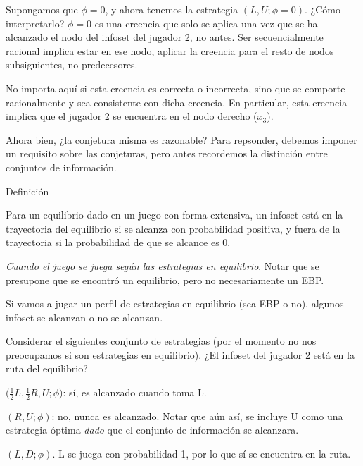 \documentclass[12pt]{article}
\begin{document}
Supongamos que $ \phi = 0 $, y ahora tenemos la estrategia $ (L, U; \phi = 0) $. ¿Cómo interpretarlo? $ \phi=0 $ es una creencia que solo se aplica una vez que se ha alcanzado el nodo del infoset del jugador 2, no antes. Ser secuencialmente racional implica estar en ese nodo, aplicar la creencia para el resto de nodos subsiguientes, no predecesores.

No importa aquí si esta creencia es correcta o incorrecta, sino que se comporte racionalmente y sea consistente con dicha creencia. En particular, esta creencia implica que el jugador 2 se encuentra en el nodo derecho ($ x_3 $).

Ahora bien, ¿la conjetura misma es razonable? Para repsonder, debemos imponer un requisito sobre las conjeturas, pero antes recordemos la distinción entre conjuntos de información.

\begin{mybox}{Definición}
	\begin{defi}
		Para un equilibrio dado en un juego con forma extensiva, un infoset está en la trayectoria del equilibrio si se alcanza con probabilidad positiva, y fuera de la trayectoria si la probabilidad de que se alcance es 0.

		\textit{Cuando el juego se juega según las estrategias en equilibrio}. Notar que se presupone que se encontró un equilibrio, pero no necesariamente un EBP.
	\end{defi}

\end{mybox}

Si vamos a jugar un perfil de estrategias en equilibrio (sea EBP o no), algunos infoset se alcanzan o no se alcanzan.

Considerar el siguientes conjunto de estrategias (por el momento no nos preocupamos si son estrategias en equilibrio). ¿El infoset del jugador 2 está en la ruta del equilibrio?

\begin{myenum}
	\item $\biggl( \frac{1}{2}L, \frac{1}{2}R, U; \phi \biggr)$: sí, es alcanzado cuando toma L.
	\item $( R, U; \phi )$: no, nunca es alcanzado. Notar que aún así, se incluye U como una estrategia óptima \textit{dado} que el conjunto de información se alcanzara.
	\item $ (L, D; \phi) $. L se juega con probabilidad 1, por lo que sí se encuentra en la ruta.
\end{myenum}
\end{document}
